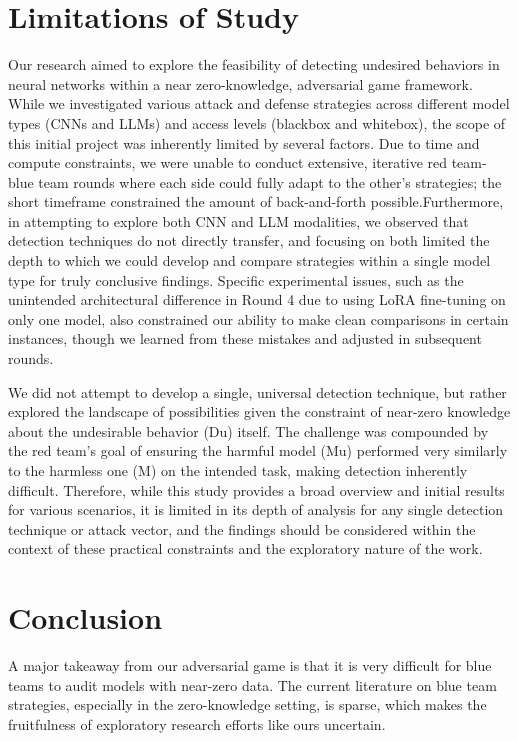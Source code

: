 \documentclass[letterpaper]{article} %
\begin{document}
\section{Limitations of Study}
Our research aimed to explore the feasibility of detecting undesired behaviors in neural networks within a near zero-knowledge, adversarial game framework. While we investigated various attack and defense strategies across different model types (CNNs and LLMs) and access levels (blackbox and whitebox), the scope of this initial project was inherently limited by several factors. Due to time and compute constraints, we were unable to conduct extensive, iterative red team-blue team rounds where each side could fully adapt to the other's strategies; the short timeframe constrained the amount of back-and-forth possible.Furthermore, in attempting to explore both CNN and LLM modalities, we observed that detection techniques do not directly transfer, and focusing on both limited the depth to which we could develop and compare strategies within a single model type for truly conclusive findings. Specific experimental issues, such as the unintended architectural difference in Round 4 due to using LoRA fine-tuning on only one model, also constrained our ability to make clean comparisons in certain instances, though we learned from these mistakes and adjusted in subsequent rounds. 

We did not attempt to develop a single, universal detection technique, but rather explored the landscape of possibilities given the constraint of near-zero knowledge about the undesirable behavior (Du) itself. The challenge was compounded by the red team's goal of ensuring the harmful model (Mu) performed very similarly to the harmless one (M) on the intended task, making detection inherently difficult. Therefore, while this study provides a broad overview and initial results for various scenarios, it is limited in its depth of analysis for any single detection technique or attack vector, and the findings should be considered within the context of these practical constraints and the exploratory nature of the work.


\section{Conclusion}
A major takeaway from our adversarial game is that it is very difficult for blue teams to audit models with near-zero data. The current literature on blue team strategies, especially in the zero-knowledge setting, is sparse, which makes the fruitfulness of exploratory research efforts like ours uncertain. 
\end{document}
